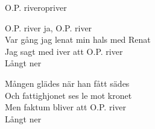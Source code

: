 \begin{song}{O.P. river}{opriver}
\begin{vers}
O.P. river ja, O.P. river\\
Var gång jag lenat min hals med Renat\\
Jag sagt med iver att O.P. river\\
Långt ner\\
\end{vers}
\begin{vers}
Mången glädes när han fått sädes\\
Och fattighjonet ses le mot kronet\\
Men faktum bliver att O.P. river\\
Långt ner\\
\end{vers}
\end{song}
